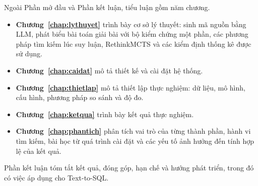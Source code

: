 
Ngoài Phần mở đầu và Phần kết luận, tiểu luận gồm năm chương.
\begin{itemize}
  \item \textbf{Chương~\ref{chap:lythuyet}} trình bày cơ sở lý thuyết: sinh mã nguồn bằng LLM, phát biểu bài toán giải bài với bộ kiểm chứng một phần, các phương pháp tìm kiếm lúc suy luận, RethinkMCTS và các kiểm định thống kê được sử dụng.
  \item \textbf{Chương~\ref{chap:caidat}} mô tả thiết kế và cài đặt hệ thống.
  \item \textbf{Chương~\ref{chap:thietlap}} mô tả thiết lập thực nghiệm: dữ liệu, mô hình, cấu hình, phương pháp so sánh và độ đo.
  \item \textbf{Chương~\ref{chap:ketqua}} trình bày kết quả thực nghiệm.
  \item \textbf{Chương~\ref{chap:phantich}} phân tích vai trò của từng thành phần, hành vi tìm kiếm, bài học từ quá trình cài đặt và các yếu tố ảnh hưởng đến tính hợp lệ của kết quả.
\end{itemize}
Phần kết luận tóm tắt kết quả, đóng góp, hạn chế và hướng phát triển, trong đó có việc áp dụng cho Text-to-SQL.
